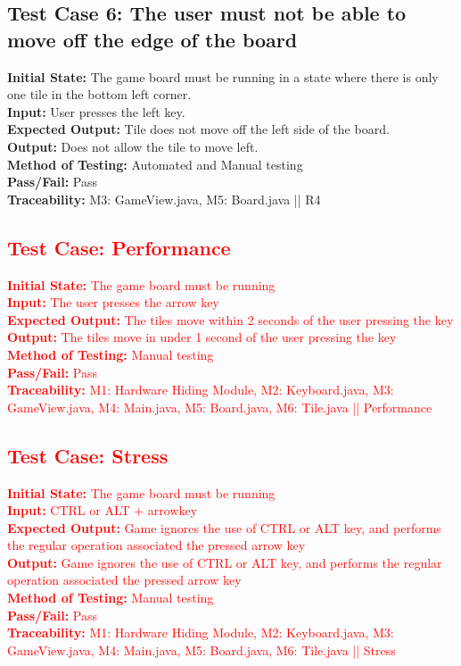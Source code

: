\documentclass[12pt]{article}
\begin{document}
\subsection{Test Case 6: The user must not be able to move off the edge of the board}

\textbf{Initial State:} The game board must be running in a state where there is only one tile in the bottom left corner.\\
\textbf{Input:} User presses the left key.\\
\textbf{Expected Output:} Tile does not move off the left side of the board.\\
\textbf{Output:} Does not allow the tile to move left.\\
\textbf{Method of Testing:} Automated and Manual testing\\
\textbf{Pass/Fail:} Pass\\
\textbf{Traceability:} M3: GameView.java, M5: Board.java || R4

\subsection{\textcolor{red}{Test Case: Performance}}
\textcolor{red}{
\textbf{Initial State:} The game board must be running\\
\textbf{Input:} The user presses the arrow key\\
\textbf{Expected Output:} The tiles move within 2 seconds of the user pressing the key\\
\textbf{Output:} The tiles move in under 1 second of the user pressing the key\\
\textbf{Method of Testing:} Manual testing\\
\textbf{Pass/Fail:} Pass\\
\textbf{Traceability:} M1: Hardware Hiding Module, M2: Keyboard.java, M3: GameView.java, M4: Main.java, M5: Board.java, M6: Tile.java || Performance}

\subsection{\textcolor{red}{Test Case: Stress}}
\textcolor{red}{
\textbf{Initial State:} The game board must be running\\
\textbf{Input:} CTRL or ALT + arrowkey\\
\textbf{Expected Output:} Game ignores the use of CTRL or ALT key, and performs the regular operation associated the pressed arrow key\\
\textbf{Output:} Game ignores the use of CTRL or ALT key, and performs the regular operation associated the pressed arrow key\\
\textbf{Method of Testing:} Manual testing\\
\textbf{Pass/Fail:} Pass\\
\textbf{Traceability:} M1: Hardware Hiding Module, M2: Keyboard.java, M3: GameView.java, M4: Main.java, M5: Board.java, M6: Tile.java || Stress}
\end{document}
